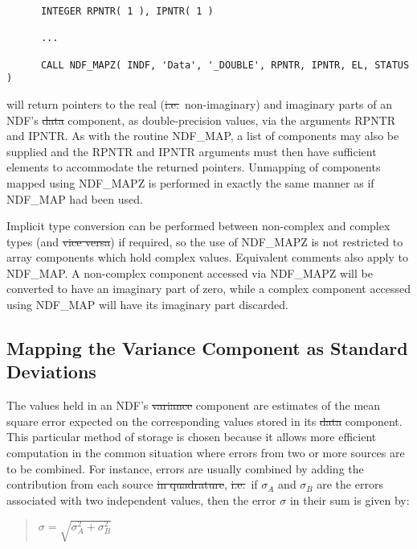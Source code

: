 \small
\begin{verbatim}
      INTEGER RPNTR( 1 ), IPNTR( 1 )

      ...

      CALL NDF_MAPZ( INDF, 'Data', '_DOUBLE', RPNTR, IPNTR, EL, STATUS )
\end{verbatim}
\normalsize

will return pointers to the real (\st{i.e.}\ non-imaginary\/) and imaginary parts
of an NDF's \st{data\/} component, as double-precision values, via the arguments
RPNTR and IPNTR. 
As with the routine NDF\_MAP, a list of components may also be supplied and
the RPNTR and IPNTR arguments must then have sufficient elements to accommodate
the returned pointers. 
Unmapping of components mapped using NDF\_MAPZ is performed in exactly  the same
manner as if NDF\_MAP had been used.

Implicit type conversion can be performed between non-complex and complex types
(and \st{vice versa\/}) if required, so the use of NDF\_MAPZ is not restricted to
array components which hold complex values.
Equivalent comments also apply to NDF\_MAP.
A non-complex component accessed via NDF\_MAPZ will be converted to have an
imaginary part of zero, while a complex component accessed using NDF\_MAP
will have its imaginary part discarded. 

\subsection{\label{ss:stddev}Mapping the Variance Component as Standard Deviations}

The values held in an NDF's \st{variance\/} component are estimates of the
mean square error expected on the corresponding values stored in its
\st{data\/} component.  
This particular method of storage is chosen because it allows more efficient
computation in the common situation where errors from two or more sources
are to be combined. 
For instance, errors are usually combined by adding the contribution from
each source \st{in quadrature}, \st{i.e.}\ if $\sigma_{A}$ and
$\sigma_{B}$ are the errors associated with two independent values, then the
error $\sigma$ in their sum is given by: 

\small
\begin{quote}
\begin{center}
$\sigma = \sqrt{ \sigma_{A}^{2} + \sigma_{B}^{2} }$
\end{center}
\end{quote}
\normalsize

